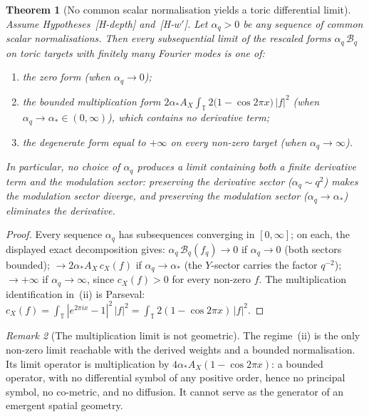 \documentclass[11pt,a4paper]{article}
\theoremstyle{plain}
\newtheorem{theorem}{Theorem}[section]
\theoremstyle{definition}
\theoremstyle{remark}
\newtheorem{remark}[theorem]{Remark}
\newcommand{\T}{\mathbb{T}}
\begin{document}
    \begin{theorem}[No common scalar normalisation yields a toric differential limit]
      \label{thm:nogo}
      Assume Hypotheses~\textup{[H-depth]} and~\textup{[H-$w'$]}.
      Let $\alpha_q > 0$ be any sequence of common scalar normalisations.
      Then every subsequential limit of the rescaled forms $\alpha_q\,\mathcal{B}_q$ on toric targets
      with finitely many Fourier modes is one of:
      \begin{enumerate}
        \item[\textup{(i)}] the zero form (when $\alpha_q \to 0$);
        \item[\textup{(ii)}] the bounded multiplication form
        $2\alpha_\ast A_X \int_\T 2\bigl(1 - \cos 2\pi x\bigr)\, |f|^2$ (when
        $\alpha_q \to \alpha_\ast \in (0, \infty)$), which contains no derivative term;
        \item[\textup{(iii)}] the degenerate form equal to $+\infty$ on every non-zero target (when
        $\alpha_q \to \infty$).
      \end{enumerate}
      In particular, no choice of $\alpha_q$ produces a limit containing both a finite derivative term
      and the modulation sector: preserving the derivative sector ($\alpha_q \sim q^2$) makes the
      modulation sector diverge, and preserving the modulation sector ($\alpha_q \to \alpha_\ast$)
      eliminates the derivative.
    \end{theorem}

    \begin{proof}
      Every sequence $\alpha_q$ has subsequences converging in $[0, \infty]$; on each, the displayed
      exact decomposition gives:
      $\alpha_q\,\mathcal{B}_q(f_q) \to 0$ if $\alpha_q \to 0$ (both sectors bounded);
      $\to 2\alpha_\ast A_X\, c_X(f)$ if $\alpha_q \to \alpha_\ast$ (the $Y$-sector carries the factor
      $q^{-2}$);
      $\to +\infty$ if $\alpha_q \to \infty$, since $c_X(f) > 0$ for every non-zero $f$.
      The multiplication identification in~(ii) is Parseval:
      $c_X(f) = \int_\T |e^{2\pi i x} - 1|^2\, |f|^2 = \int_\T 2(1 - \cos 2\pi x)\, |f|^2$.
    \end{proof}

    \begin{remark}[The multiplication limit is not geometric]
      \label{rem:multiplication}
      The regime~(ii) is the only non-zero limit reachable with the derived weights and a bounded
      normalisation.
      Its limit operator is multiplication by $4 \alpha_\ast A_X (1 - \cos 2\pi x)$: a bounded
      operator, with no differential symbol of any positive order, hence no principal symbol, no
      co-metric, and no diffusion.
      It cannot serve as the generator of an emergent spatial geometry.
    \end{remark}
\end{document}
